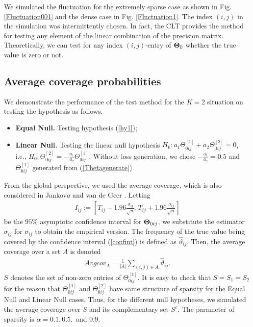 \documentclass[review]{elsarticle}
\newcommand{\1}{{\bf 1}}
\newcommand{\0}{{\bf 0}}
\newcommand{\bqa}{\begin{eqnarray}}
\newcommand{\eqa}{\end{eqnarray}}
\begin{document}
 We simulated the fluctuation for the extremely sparse case as shown in Fig. \ref{Fluctuation001} and the
 dense case in Fig. \ref{Fluctuation1}.
 The index $(i,j)$ in the simulation was intermittently chosen.
 In fact, the CLT provides the method for testing any element of the linear combination of the precision matrix.
 Theoretically, we can test for any index $(i,j)$-entry of ${\bf \Theta}_{0}$ whether the true value is zero or not.

\subsection{Average coverage probabilities}

 We demonstrate the performance of the test method for the $K=2$ situation on testing the hypothesis as follows.
 \begin{itemize}
   \item {\bf Equal Null.} Testing hypothesis (\ref{hy1});
   \item {\bf Linear Null.} Testing the linear null hypothesis $H_0: a_1\Theta^{[1]}_{0ij}+a_2\Theta^{[2]}_{0ij}=0$, i.e., $H_0: \Theta^{[2]}_{0ij}=-\frac{a_1}{a_2}\Theta^{[1]}_{0ij}$. Without loss generation, we chose $-\frac{a_1}{a_2}=0.5$ and $\Theta^{[1]}_{0ij}$ generated from (\ref{Thetagenerate}).
 \end{itemize}

 From the global perspective, we used the average coverage, which is also considered in Jankov$\acute{a}$ and van de Geer \cite{jankova2015confidence}.
 Letting
\bqa\label{confint}
I_{ij}:=\left[T_{ij}-1.96\frac{\sigma_{ij}}{\sqrt{n}}, T_{ij}+1.96\frac{\sigma_{ij}}{\sqrt{n}}\right]
\eqa
 be the $95\%$ asymptotic confidence interval for ${\bf \Theta}_{0ij}$,
 we substitute the estimator $\hat\sigma_{ij}$ for $\sigma_{ij}$ to obtain the empirical version.
 The frequency of the true value being covered by the confidence interval (\ref{confint}) is defined as $\hat\vartheta_{ij}$.
 Then, the average coverage over a set $A$ is denoted
\bqa
Avgcov_{A}=\frac{1}{|A|}\sum_{(i,j)\in A}\hat\vartheta_{ij}.
\eqa
 $S$ denotes the set of non-zero entries of $\Theta^{[1]}_{0ij}$.
 It is easy to check that $S=S_1=S_2$ for the reason that $\Theta^{[1]}_{0ij}$ and $\Theta^{[2]}_{0ij}$ have same structure of sparsity for the Equal Null and Linear Null cases.
 Thus, for the different null hypotheses, we simulated the average coverage over $S$ and its complementary set $S^c$.
 The parameter of sparsity is $\tilde\alpha=0.1, 0.5,$ and $0.9$.
\end{document}
